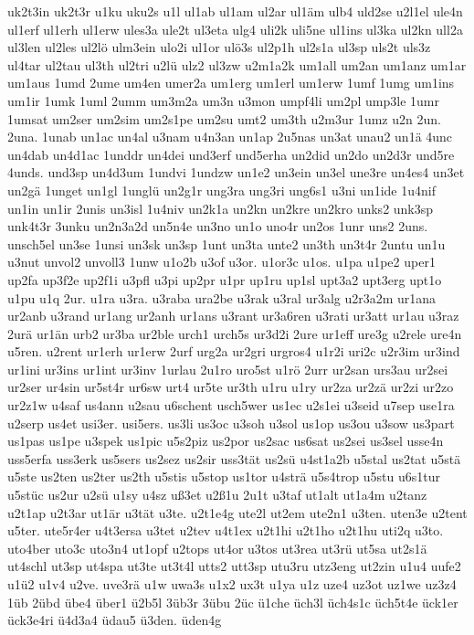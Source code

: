 {uk2t3in
uk2t3r
u1ku
uku2s
u1l
ul1ab
ul1am
ul2ar
ul1äm
ulb4
uld2se
u2l1el
ule4n
ul1erf
ul1erh
ul1erw
ules3a
ule2t
ul3eta
ulg4
uli2k
uli5ne
ul1ins
ul3ka
ul2kn
ull2a
ul3len
ul2les
ul2lö
ulm3ein
ulo2i
ul1or
ulö3s
ul2p1h
ul2s1a
ul3sp
uls2t
uls3z
ul4tar
ul2tau
ul3th
ul2tri
u2lü
ulz2
ul3zw
u2m1a2k
um1all
um2an
um1anz
um1ar
um1aus
1umd
2ume
um4en
umer2a
um1erg
um1erl
um1erw
1umf
1umg
um1ins
um1ir
1umk
1uml
2umm
um3m2a
um3n
u3mon
umpf4li
um2pl
ump3le
1umr
1umsat
um2ser
um2sim
um2s1pe
um2su
umt2
um3th
u2m3ur
1umz
u2n
2un.
2una.
1unab
un1ac
un4al
u3nam
u4n3an
un1ap
2u5nas
un3at
unau2
un1ä
4unc
un4dab
un4d1ac
1unddr
un4dei
und3erf
und5erha
un2did
un2do
un2d3r
und5re
4unds.
und3sp
un4d3um
1undvi
1undzw
un1e2
un3ein
un3el
une3re
un4es4
un3et
un2gä
1unget
un1gl
1unglü
un2g1r
ung3ra
ung3ri
ung6s1
u3ni
un1ide
1u4nif
un1in
un1ir
2unis
un3isl
1u4niv
un2k1a
un2kn
un2kre
un2kro
unks2
unk3sp
unk4t3r
3unku
un2n3a2d
un5n4e
un3no
un1o
uno4r
un2os
1unr
uns2
2uns.
unsch5el
un3se
1unsi
un3sk
un3sp
1unt
un3ta
unte2
un3th
un3t4r
2untu
un1u
u3nut
unvol2
unvoll3
1unw
u1o2b
u3of
u3or.
u1or3c
u1os.
u1pa
u1pe2
uper1
up2fa
up3f2e
up2f1i
u3pfl
u3pi
up2pr
u1pr
up1ru
up1sl
upt3a2
upt3erg
upt1o
u1pu
u1q
2ur.
u1ra
u3ra.
u3raba
ura2be
u3rak
u3ral
ur3alg
u2r3a2m
ur1ana
ur2anb
u3rand
ur1ang
ur2anh
ur1ans
u3rant
ur3a6ren
u3rati
ur3att
ur1au
u3raz
2urä
ur1än
urb2
ur3ba
ur2ble
urch1
urch5s
ur3d2i
2ure
ur1eff
ure3g
u2rele
ure4n
u5ren.
u2rent
ur1erh
ur1erw
2urf
urg2a
ur2gri
urgros4
u1r2i
uri2c
u2r3im
ur3ind
ur1ini
ur3ins
ur1int
ur3inv
1urlau
2u1ro
uro5st
u1rö
2urr
ur2san
urs3au
ur2sei
ur2ser
ur4sin
ur5st4r
ur6sw
urt4
ur5te
ur3th
u1ru
u1ry
ur2za
ur2zä
ur2zi
ur2zo
ur2z1w
u4saf
us4ann
u2sau
u6schent
usch5wer
us1ec
u2s1ei
u3seid
u7sep
use1ra
u2serp
us4et
usi3er.
usi5ers.
us3li
us3oc
u3soh
u3sol
us1op
us3ou
u3sow
us3part
us1pas
us1pe
u3spek
us1pic
u5s2piz
us2por
us2sac
us6sat
us2sei
us3sel
usse4n
uss5erfa
uss3erk
us5sers
us2sez
us2sir
uss3tät
us2sü
u4st1a2b
u5stal
us2tat
u5stä
u5ste
us2ten
us2ter
us2th
u5stis
u5stop
us1tor
u4strä
u5s4trop
u5stu
u6s1tur
u5stüc
us2ur
u2sü
u1sy
u4sz
uß3et
u2ß1u
2u1t
u3taf
ut1alt
ut1a4m
u2tanz
u2t1ap
u2t3ar
ut1är
u3tät
u3te.
u2t1e4g
ute2l
ut2em
ute2n1
u3ten.
uten3e
u2tent
u5ter.
ute5r4er
u4t3ersa
u3tet
u2tev
u4t1ex
u2t1hi
u2t1ho
u2t1hu
uti2q
u3to.
uto4ber
uto3c
uto3n4
ut1opf
u2tops
ut4or
u3tos
ut3rea
ut3rü
ut5sa
ut2s1ä
ut4schl
ut3sp
ut4spa
ut3te
ut3t4l
utts2
utt3sp
utu3ru
utz3eng
ut2zin
u1u4
uufe2
u1ü2
u1v4
u2ve.
uve3rä
u1w
uwa3s
u1x2
ux3t
u1ya
u1z
uze4
uz3ot
uz1we
uz3z4
1üb
2übd
übe4
über1
ü2b5l
3üb3r
3übu
2üc
ü1che
üch3l
üch4s1c
üch5t4e
ück1er
ück3e4ri
ü4d3a4
üdau5
ü3den.
üden4g
}
